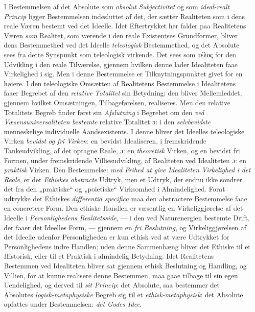 I Bestemmelsen af det Absolute som \emph{absolut Subjectivitet} og som
\emph{ideal-realt Princip} ligger Bestemmelsen indesluttet af det, der sætter
Realiteten som i dens reale Væren bestemt ved det Ideelle. Idet Eftertrykket
her falder paa Realitetens Væren \emph{som} Realitet, som værende i
 den reale Existentses Grundformer, bliver dens Bestemmethed ved det Ideelle
\emph{teleologisk} Bestemmethed, og det Absolute sees fra dette Synspunkt som
teleologisk virkende. Det sees som τέλος for den Udvikling i den reale
Tilværelse, gjennem hvilken denne lader Idealiteten faae Virkelighed i sig.
Men i denne Bestemmelse er Tilknytningspunktet givet for en høiere. I den
teleologiske Omsætten af Realitetens Bestemmelse i Idealitetens faaer Begrebet
af den \emph{relative Totalitet} sin Betydning: den bliver Mellemleddet,
gjennem hvilket Omsætningen, Tilbageførelsen, realiseres. Men den relative
Totalitets Begreb finder først sin \emph{Afslutning} i Begrebet om den
\emph{ved Væsensuniversaliteten bestemte} relative Totalitet ɔ: i den
\emph{selvbevidste} menneskelige individuelle Aandsexistents. I denne bliver
det Ideelles teleologiske Virken \emph{bevidst og fri Virken}: en bevidst
Idealiseren, i fremskridende Tankeudvikling, af det optagne Reale, ɔ: en
\emph{theoretisk} Virken, og en bevidst fri Formen, under fremskridende
Villiesudvikling, af Realiteten ved Idealiteten ɔ: en \emph{praktisk} Virken.
Den Bestemmelse: \emph{med Frihed at give Idealiteten Virkelighed i det
Reale}, er det \emph{Ethiskes abstracte} Udtryk, men et Udtryk, der endnu ikke
sondrer det fra den „praktiske“ og „poietiske“ Virksomhed i Almindelighed.
Forat udtrykke det Ethiskes \textit{differentia specifica} maa den abstractere
Bestemmelse faae en concretere Form. Den ethiske Handlen er væsentlig en
Virkeliggjørelse af det Ideelle i \emph{Personlighedens Realitetsside}, --- i
den ved Naturenergien bestemte Drift, der faaer det Ideelles Form, ---
gjennem en \emph{fri Beslutning}, og Virkeliggjørelsen af det Ideelle udenfor
Personligheden er kun ethisk ved at være Udtrykket for Personlighedens indre
Handlen; uden denne Sammenhæng bliver det Ethiske til et Historisk, eller til
et Praktisk i almindelig Betydning. Idet Realitetens Bestemmen ved Idealiteten
bliver sat gjennem ethisk Beslutning og Handling, og Villien, for at kunne
realisere denne Bestemmen, maa gaae tilbage til sin egen Uendelighed, og
derved til \emph{sit Princip}: det Absolute, saa bestemmer det Absolutes
\emph{logisk-metaphysiske} Begreb sig til et \emph{ethisk-metaphysisk}:
 det Absolute opfattes under Bestemmelsen: \emph{det Godes Idee}.

